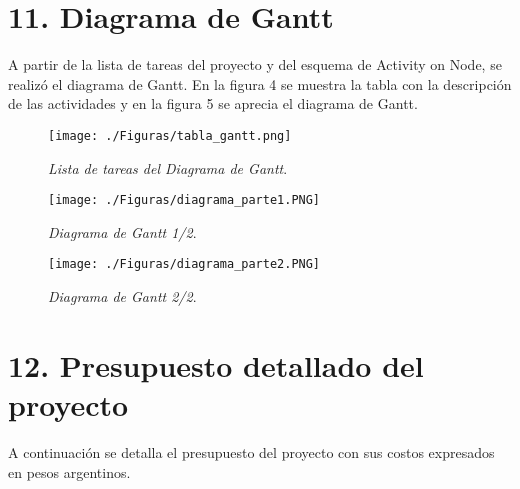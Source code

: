 \documentclass[
11pt, %
]{charter}
\begin{document}
\section{11. Diagrama de Gantt}
\label{sec:gantt}

A partir de la lista de tareas del proyecto y del esquema de Activity on Node, se realizó el
diagrama de Gantt. En la figura 4 se muestra la tabla con la descripción de las actividades y en la figura 5 
se aprecia el diagrama de Gantt. 

\begin{figure}[htpb]
  \centering 
  \texttt{[image: ./Figuras/tabla\_gantt.png]}
  \caption{\textit{Lista de tareas del Diagrama de Gantt}.}
  \label{fig:tablaGantt}
\end{figure}
\pagebreak



\begin{figure}[htpb]
  \centering 
  \texttt{[image: ./Figuras/diagrama\_parte1.PNG]}
  \caption{\textit{Diagrama de Gantt 1/2}.}
  \label{fig:diagramap1}
\end{figure}
\pagebreak

\begin{figure}[htpb]
  \centering 
  \texttt{[image: ./Figuras/diagrama\_parte2.PNG]}
  \caption{\textit{Diagrama de Gantt 2/2}.}
  \label{fig:diagramap2}
\end{figure}
\pagebreak
\section{12. Presupuesto detallado del proyecto}
\label{sec:presupuesto}

A continuación se detalla el presupuesto del proyecto con sus costos expresados en pesos argentinos.
\end{document}
